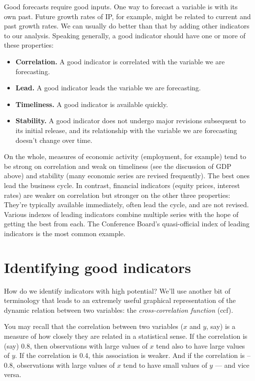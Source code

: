 Good forecasts require good inputs.
One way to forecast a variable is with its own past.
Future growth rates of IP, for example, might be related
to current and past growth rates.
We can usually do better than that by adding other indicators
to our analysis.
Speaking generally,
a good indicator should have one or more of these properties:
%
\begin{itemize}

\item \textbf{Correlation.}  A good indicator is correlated with the
variable we are forecasting.

\item \textbf{Lead.} A good indicator leads the variable we are
forecasting.

\item \textbf{Timeliness.}  A good indicator is available quickly.

\item\textbf{Stability.}  A good indicator does not undergo major
revisions subsequent to its initial release, and its
relationship with the variable we are forecasting doesn't
change over time.

\end{itemize}
On the whole, measures of economic activity
(employment, for example)
tend to be strong on correlation and weak on timeliness (see the
discussion of GDP above) and stability (many economic series are
revised frequently).  The best ones lead the business cycle.  In
contrast, financial indicators (equity prices, interest rates) are
weaker on correlation but stronger on the other three properties:
They're typically available immediately, often lead the cycle, and
are not revised.
Various indexes of leading indicators combine multiple series with the
hope of getting the best from each.  The Conference Board's
quasi-official index of leading indicators is the most common example.



\section{Identifying good indicators}

How do we identify indicators with high potential?
We'll use another bit of terminology that leads to an extremely useful
graphical representation of the dynamic relation between two variables:
the {\it cross-correlation function\/} (ccf).

You may recall that the correlation between two variables
($x$ and $y$, say) is a measure of
how closely they are related in a statistical sense.
If the correlation is (say) 0.8,
then observations with large values of $x$
tend also to have large values of $y$.
If the correlation is 0.4, this association is weaker.
And if the correlation is --0.8,
observations with large values of $x$
tend to have small values of $y$ --- and vice versa.

